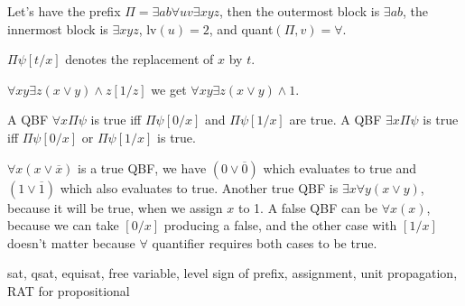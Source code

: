\begin{example}
    Let's have the prefix $\Pi = \exists ab \forall uv \exists xyz$, then the outermost block is $\exists ab$, the innermost block is $\exists xyz$, lv$(u) = 2$, and quant$(\Pi, v) = \forall$.
\end{example}

\begin{definition}
    $\Pi\psi[t/x]$ denotes the replacement of $x$ by $t$.
\end{definition}

\begin{example}
    $\forall xy \exists z (x \lor y) \land z[1/z]$ we get $\forall xy \exists z (x \lor y) \land 1$.
\end{example}

\begin{definition}\label{def:semantics}
    A QBF $\forall x \Pi \psi$ is true iff $\Pi \psi[0/x]$ and $\Pi \psi[1/x]$ are true. A QBF $\exists x \Pi \psi$ is true iff $\Pi \psi[0/x]$ or $\Pi \psi[1/x]$ is true.
\end{definition}

\begin{example}
    $\forall x (x \lor \overline{x})$ is a true QBF, we have $(0 \lor \overline{0})$ which evaluates to true and $(1 \lor \overline{1})$ which also evaluates to true. Another true QBF is $\exists x \forall y (x \lor y)$, because it will be true, when we assign $x$ to 1. A false QBF can be $\forall x (x)$, because we can take $[0/x]$ producing a false, and the other case with $[1/x]$ doesn't matter because $\forall$ quantifier requires both cases to be true.
\end{example}

\begin{definition}
\end{definition}

sat, qsat, equisat, free variable, level sign of prefix, assignment, unit propagation, RAT for propositional
